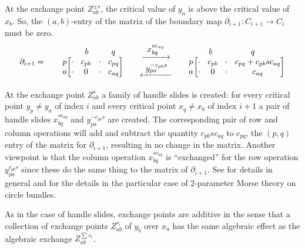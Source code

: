 \documentclass[11pt]{article}
\numberwithin{equation}{section}\providecommand{\dpl}{\displaystyle}
\newcommand\To[1]{\mathchoice{\xrightarrow{\textstyle\kern4pt#1\kern3pt}}{\stackrel{#1}{\longrightarrow}}{}{}}
\newcommand\From[1]{\mathchoice{\xleftarrow{\textstyle~#1~}}{\stackrel{#1}{\longleftarrow}}{}{}}
\theoremstyle{plain}
\theoremstyle{definition}
\newcommand{\mat}[1]{\ensuremath{
\left[\begin{matrix}#1
\end{matrix}\right]
}}
\begin{document}
At the exchange point $Z_{ab}^{\pm s}$, the critical value of $y_a$ is above the critical value of~$x_b$. So, the $(a,b)$-entry of the matrix of the boundary map $\partial_{i+1}:C_{i+1}\to C_i$ must be zero.
\[\arraycolsep4.5pt
\partial_{i+1}=\qquad \begin{matrix}\ \\ p\\a
\end{matrix}
\begin{matrix}
\begin{matrix} \ & b\quad & & q\end{matrix}\\
\mat{
\cdot & c_{pb} & \cdot & c_{pq}\\
\cdot & 0 & \cdot & c_{aq}
}
\end{matrix}
\qquad
\begin{matrix}\dpl
\To{x_{bq}^{sc_{aq}}}\\
\dpl\From{y_{pa}^{-c_{pb}s}}
\end{matrix}
\qquad \begin{matrix}\ \\ p\\a
\end{matrix}
\begin{matrix}
\begin{matrix} \quad & b &&& \qquad q &\quad& & \end{matrix}\\
\mat{
\cdot & c_{pb} & \cdot & c_{pq}+c_{pb}sc_{aq}\\
\cdot & 0 & \cdot & c_{aq}
}
\end{matrix}
\]

At the exchange point $Z_{ab}^{s}$ a family of handle slides is created: for every critical point $y_p\neq y_a$ of index $i$ and every critical point $x_q\neq x_b$ of index $i+1$ a pair of handle slides $x_{bq}^{s c_{aq}}$ and $y_{pa}^{-c_{pb}s}$ are created. The corresponding pair of row and column operations will add and subtract the quantity $c_{pb}s c_{aq}$ to $c_{pq}$, the $(p,q)$ entry of the matrix for $\partial_{i+1}$, resulting in no change in the matrix. Another viewpoint is that the column operation $x_{bq}^{s c_{aq}}$ is ``exchanged'' for the row operation $y_{pa}^{c_{pb}s}$ since these do the same thing to the matrix of $\partial_{i+1}$. See \cite{HW73} for details in general and \cite{IK93} for the details in the particular case of $2$-parameter Morse theory on circle bundles.

As in the case of handle slides, exchange points are additive in the sense that a collection of exchange points $Z_{ab}^{s_i}$ of $y_b$ over $x_a$ has the same algebraic effect as the algebraic exchange $Z_{ab}^{\sum s_i}$.
\end{document}
